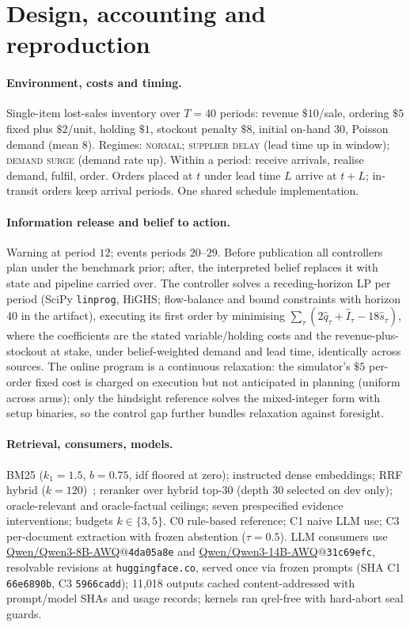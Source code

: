 \documentclass[runningheads]{llncs}
\begin{document}
\appendix
\section{Design, accounting and reproduction}
\label{app:design}

\paragraph{Environment, costs and timing.}
Single-item lost-sales inventory over $T=40$ periods: revenue $\$10$/sale,
ordering $\$5$ fixed plus $\$2$/unit, holding $\$1$, stockout penalty $\$8$,
initial on-hand $30$, Poisson demand (mean $8$). Regimes: \textsc{normal};
\textsc{supplier delay} (lead time up in window); \textsc{demand surge}
(demand rate up). Within a period: receive arrivals, realise demand, fulfil,
order. Orders placed at $t$ under lead time $L$ arrive at $t+L$; in-transit
orders keep arrival periods. One shared schedule implementation.

\paragraph{Information release and belief to action.}
Warning at period $12$; events periods $20$--$29$. Before publication all
controllers plan under the benchmark prior; after, the interpreted belief
replaces it with state and pipeline carried over. The controller solves a
receding-horizon LP per period (SciPy \texttt{linprog}, HiGHS; flow-balance
and bound constraints with horizon 40 in the artifact), executing its first order by minimising
$\sum_\tau(2\hat{q}_\tau+\hat{I}_\tau-18\hat{s}_\tau)$, where the coefficients are the stated variable/holding
costs and the revenue-plus-stockout at stake, under
belief-weighted demand and lead time, identically across sources. The online
program is a continuous relaxation: the simulator's $\$5$ per-order fixed
cost is charged on execution but not anticipated in planning (uniform across
arms); only the hindsight reference solves the mixed-integer form with setup
binaries, so the control gap further bundles relaxation against foresight.

\paragraph{Retrieval, consumers, models.}
BM25 ($k_1=1.5$, $b=0.75$, idf floored at zero); instructed dense embeddings;
RRF hybrid ($k=120$)~\cite{cormack2009reciprocal}; reranker over hybrid top-30 (depth 30 selected on dev
only); oracle-relevant and oracle-factual ceilings; seven prespecified
evidence interventions; budgets $k\in\{3,5\}$. C0 rule-based reference; C1
naive LLM use; C3 per-document extraction with frozen abstention
($\tau=0.5$). LLM consumers use \url{Qwen/Qwen3-8B-AWQ}@\texttt{4da05a8e}
and \url{Qwen/Qwen3-14B-AWQ}@\texttt{31c69efc}, resolvable revisions at
\texttt{huggingface.co}, served once via frozen
prompts (SHA C1 \texttt{66e6890b}, C3 \texttt{5966cadd}); 11{,}018 outputs
cached content-addressed with prompt/model SHAs and usage records; kernels
ran qrel-free with hard-abort seal guards.
\end{document}
